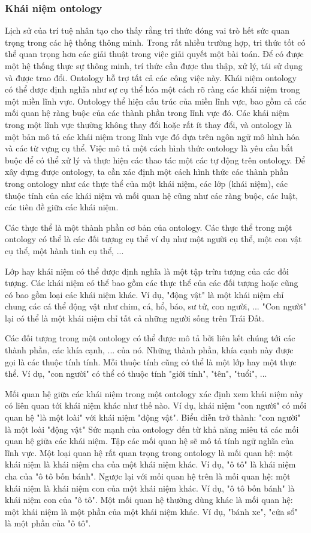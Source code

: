 \subsubsection{Khái niệm ontology}
Lịch sử của trí tuệ nhân tạo cho thấy rằng tri thức đóng vai trò hết sức quan trọng trong các hệ thống thông minh. Trong rất nhiều trường hợp, tri thức tốt có thể quan trọng hơn các giải thuật trong việc giải quyết một bài toán. Để có được một hệ thống thực sự thông minh, trí thức cần được thu thập, xử lý, tái sử dụng và được trao đổi. Ontology hỗ trợ tất cả các công việc này. Khái niệm ontology có thể được định nghĩa như sự cụ thể hóa một cách rõ ràng các khái niệm trong một miền lĩnh vực. Ontology thể hiện cấu trúc của miền lĩnh vực, bao gồm cả các mối quan hệ ràng buộc của các thành phần trong lĩnh vực đó. Các khái niệm trong một lĩnh vực thường không thay đổi hoặc rất ít thay đổi, và ontology là một bản mô tả các khái niệm trong lĩnh vực đó dựa trên ngôn ngữ mô hình hóa và các từ vựng cụ thể. Việc mô tả một cách hình thức ontology là yêu cầu bắt buộc để có thể xử lý và thực hiện các thao tác một các tự động trên ontology. Để xây dựng được ontology, ta cần xác định một cách hình thức các thành phần trong ontology như các thực thể của một khái niệm, các lớp (khái niệm), các thuộc tính của các khái niệm và mối quan hệ cũng như các ràng buộc, các luật, các tiên đề giữa các khái niệm. 

Các thực thể là một thành phần cơ bản của ontology. Các thực thể trong một ontology có thể là các đối tượng cụ thể ví dụ như một người cụ thể, một con vật cụ thể, một hành tinh cụ thể, ... 

Lớp hay khái niệm có thể được định nghĩa là một tập trừu tượng của các đối tượng. Các khái niệm có thể bao gồm các thực thể của các đối tượng hoặc cũng có bao gồm loại các khái niệm khác. Ví dụ, "động vật" là một khái niệm chỉ chung các cá thể động vật như chim, cá, hổ, báo, sư tử, con người, ... "Con người" lại có thể là một khái niệm chỉ tất cả những người sống trên Trái Đất. 

Các đối tượng trong một ontology có thể được mô tả bởi liên kết chúng tới các thành phần, các khía cạnh, ... của nó. Những thành phần, khía cạnh này được gọi là các thuộc tính tính. Mỗi thuộc tính cũng có thể là một lớp hay một thực thể. Ví dụ, "con người" có thể có thuộc tính "giới tính", "tên", "tuổi", ...
 
Mối quan hệ giữa các khái niệm trong một ontology xác định xem khái niệm này có liên quan tới khái niệm khác như thế nào. Ví dụ, khái niệm "con người" có mối quan hệ "là một loài" với khái niệm "động vật". Biểu diễn trở thành:
"con người" là một loài "động vật" 
Sức mạnh của ontology đến từ khả năng miêu tả các mối quan hệ giữa các khái niệm. Tập các mối quan hệ sẽ mô tả tính ngữ nghĩa của lĩnh vực. Một loại quan hệ rất quan trọng trong ontology là mối quan hệ: một khái niệm là khái niệm cha của một khái niệm khác. Ví dụ, "ô tô" là khái niệm cha của "ô tô bốn bánh". Ngược lại với mối quan hệ trên là mối quan hệ: một khái niệm là khái niệm con của một khái niệm khác. Ví dụ, "ô tô bốn bánh" là khái niệm con của "ô tô". Một mối quan hệ thường dùng khác là mối quan hệ: một khái niệm là một phần của một khái niệm khác. Ví dụ, "bánh xe", "cửa sổ" là một phần của "ô tô". 

